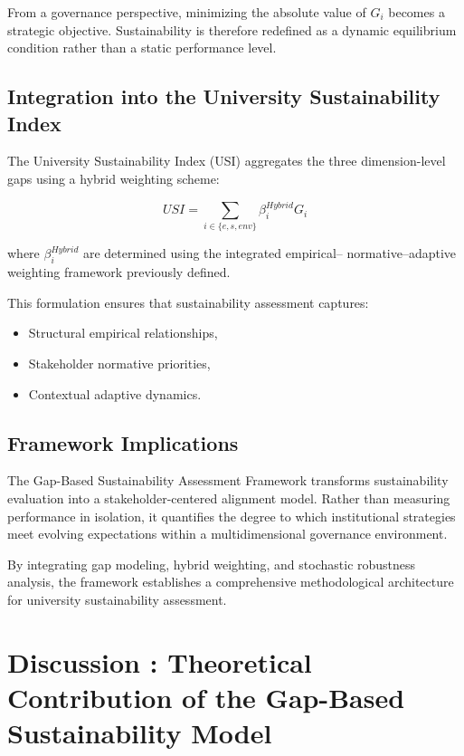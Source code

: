 \documentclass[11pt,a4paper]{article}
\begin{document}
From a governance perspective, minimizing the absolute value of $G_i$ 
becomes a strategic objective. Sustainability is therefore redefined 
as a dynamic equilibrium condition rather than a static performance level.

\subsection{Integration into the University Sustainability Index}

The University Sustainability Index (USI) aggregates the three 
dimension-level gaps using a hybrid weighting scheme:

\begin{equation}
USI =
\sum_{i \in \{e,s,env\}}
\beta_i^{Hybrid} G_i
\end{equation}

where $\beta_i^{Hybrid}$ are determined using the integrated empirical–
normative–adaptive weighting framework previously defined.

This formulation ensures that sustainability assessment captures:

\begin{itemize}
\item Structural empirical relationships,
\item Stakeholder normative priorities,
\item Contextual adaptive dynamics.
\end{itemize}

\subsection{Framework Implications}

The Gap-Based Sustainability Assessment Framework transforms 
sustainability evaluation into a stakeholder-centered alignment model. 
Rather than measuring performance in isolation, it quantifies the 
degree to which institutional strategies meet evolving expectations 
within a multidimensional governance environment.

By integrating gap modeling, hybrid weighting, and stochastic robustness 
analysis, the framework establishes a comprehensive methodological 
architecture for university sustainability assessment.

\section{Discussion : Theoretical Contribution of the Gap-Based Sustainability Model}
\end{document}
